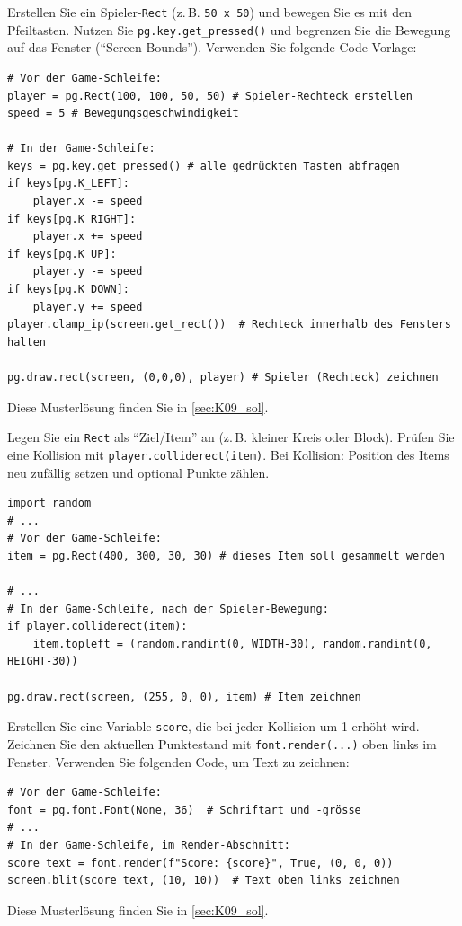 \begin{myexercise}\label{myexercise:Bewegungen}
    Erstellen Sie ein Spieler-\lstinline|Rect| (z.\,B. \lstinline|50 x 50|) und bewegen Sie es mit den Pfeiltasten. Nutzen Sie \lstinline|pg.key.get_pressed()| und begrenzen Sie die Bewegung auf das Fenster (\enquote{Screen Bounds}). Verwenden Sie folgende Code-Vorlage:
    \begin{lstlisting}
# Vor der Game-Schleife:
player = pg.Rect(100, 100, 50, 50) # Spieler-Rechteck erstellen
speed = 5 # Bewegungsgeschwindigkeit

# In der Game-Schleife:
keys = pg.key.get_pressed() # alle gedrückten Tasten abfragen
if keys[pg.K_LEFT]:
	player.x -= speed
if keys[pg.K_RIGHT]:
	player.x += speed
if keys[pg.K_UP]:
	player.y -= speed
if keys[pg.K_DOWN]:
	player.y += speed
player.clamp_ip(screen.get_rect())  # Rechteck innerhalb des Fensters halten

pg.draw.rect(screen, (0,0,0), player) # Spieler (Rechteck) zeichnen
\end{lstlisting}
	\begin{myanswer}
		Diese Musterlösung finden Sie in \cref{sec:K09_sol}.
	\end{myanswer}
\end{myexercise}

\begin{myexercise}[Kollisionen]\label{myexercise:Kollisionen}
    Legen Sie ein \lstinline|Rect| als \enquote{Ziel/Item} an (z.\,B. kleiner Kreis oder Block). Prüfen Sie eine Kollision mit \lstinline|player.colliderect(item)|. Bei Kollision: Position des Items neu zufällig setzen und optional Punkte zählen.
    \begin{lstlisting}
import random
# ...
# Vor der Game-Schleife:
item = pg.Rect(400, 300, 30, 30) # dieses Item soll gesammelt werden

# ...
# In der Game-Schleife, nach der Spieler-Bewegung:
if player.colliderect(item):
	item.topleft = (random.randint(0, WIDTH-30), random.randint(0, HEIGHT-30))

pg.draw.rect(screen, (255, 0, 0), item) # Item zeichnen
\end{lstlisting}
\end{myexercise}

\begin{myexercise}\label{myexercise:Highscore}
    Erstellen Sie eine Variable \lstinline|score|, die bei jeder Kollision um 1 erhöht wird. Zeichnen Sie den aktuellen Punktestand mit \lstinline|font.render(...)| oben links im Fenster. Verwenden Sie folgenden Code, um Text zu zeichnen:
    \begin{lstlisting}
# Vor der Game-Schleife:
font = pg.font.Font(None, 36)  # Schriftart und -grösse
# ...
# In der Game-Schleife, im Render-Abschnitt:
score_text = font.render(f"Score: {score}", True, (0, 0, 0))
screen.blit(score_text, (10, 10))  # Text oben links zeichnen
\end{lstlisting}
	\begin{myanswer}
		Diese Musterlösung finden Sie in \cref{sec:K09_sol}.
	\end{myanswer}
\end{myexercise}

